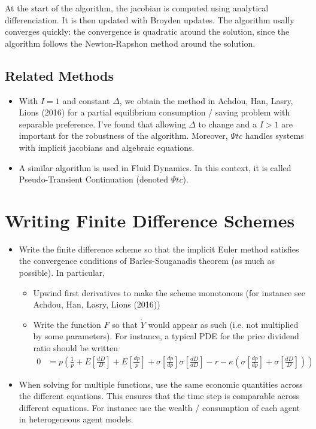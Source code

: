 \documentclass[english]{article}
\begin{document}
At the start of the algorithm, the jacobian is computed using analytical differenciation. It is then updated with Broyden updates. The algorithm usally converges quickly: the convergence is quadratic around the solution, since the algorithm follows the Newton-Rapshon method around the solution.

\subsection{Related Methods}
	
\begin{itemize}
	\item 
	With $I=1$ and constant $\Delta$, we obtain the method in Achdou, Han, Lasry, Lions (2016) for a partial equilibrium consumption / saving  problem with separable preference. I've found that allowing $\Delta$ to change  and a $I > 1$ are important for the robustness of the algorithm. Moreover, $\Psi tc$ handles systems with implicit jacobians and algebraic equations.

	\item 
	A similar algorithm is used in Fluid Dynamics. In this context, it is called Pseudo-Transient Continuation (denoted $\Psi tc$). 

\end{itemize}

\section{Writing Finite Difference Schemes}
\begin{itemize}
	\item 
	Write the finite difference scheme so that the implicit Euler method satisfies the convergence conditions of Barles-Souganadis theorem (as much as possible). In particular,
	\begin{itemize}
		\item Upwind first derivatives to make the scheme monotonous (for instance see Achdou, Han, Lasry, Lions (2016))
		\item Write the function $F$ so that $\dot{Y}$ would appear as such (i.e. not multiplied by some parameters). For instance, a typical PDE for the price dividend ratio should be written
		\begin{align*}
			0 &= p (\frac{1}{p} + E[\frac{dD}{D}] + E[\frac{dp}{p}] + \sigma[\frac{dp}{dp}]\sigma[\frac{dD}{dD}] - r - \kappa(\sigma[\frac{dp}{dp}] + \sigma[\frac{dD}{D}]))
		\end{align*}
	\end{itemize}
	\item When solving for multiple functions, use the same economic quantities across the different equations. This ensures that the time step is comparable across different equations. For instance use the wealth / consumption of each agent in heterogeneous agent models.
\end{itemize}
\end{document}
